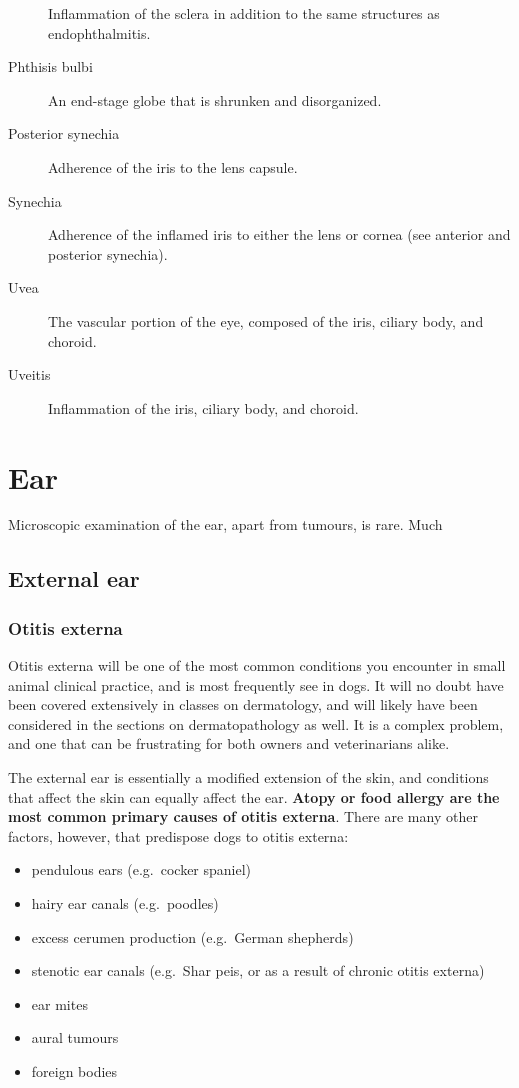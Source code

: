 \documentclass[openany]{book}
\providecommand{\tightlist}{%
  \setlength{\itemsep}{0pt}\setlength{\parskip}{0pt}}
\begin{document}
\begin{description}
Inflammation of the sclera in addition to the same structures as
endophthalmitis.
\item[Phthisis bulbi]
An end-stage globe that is shrunken and disorganized.
\item[Posterior synechia]
Adherence of the iris to the lens capsule.
\item[Synechia]
Adherence of the inflamed iris to either the lens or cornea (see
anterior and posterior synechia).
\item[Uvea]
The vascular portion of the eye, composed of the iris, ciliary body, and
choroid.
\item[Uveitis]
Inflammation of the iris, ciliary body, and choroid.
\end{description}

\chapter{Ear}\label{ear}

Microscopic examination of the ear, apart from tumours, is rare. Much

\section{External ear}\label{external-ear}

\hypertarget{otitis-externa}{\subsection{Otitis
externa}\label{otitis-externa}}

Otitis externa will be one of the most common conditions you encounter
in small animal clinical practice, and is most frequently see in dogs.
It will no doubt have been covered extensively in classes on
dermatology, and will likely have been considered in the sections on
dermatopathology as well. It is a complex problem, and one that can be
frustrating for both owners and veterinarians alike.

The external ear is essentially a modified extension of the skin, and
conditions that affect the skin can equally affect the ear.
\textbf{Atopy or food allergy are the most common primary causes of
otitis externa}. There are many other factors, however, that predispose
dogs to otitis externa:

\begin{itemize}
\tightlist
\item
  pendulous ears (e.g.~cocker spaniel)
\item
  hairy ear canals (e.g.~poodles)
\item
  excess cerumen production (e.g.~German shepherds)
\item
  stenotic ear canals (e.g.~Shar peis, or as a result of chronic otitis
  externa)
\item
  ear mites
\item
  aural tumours
\item
  foreign bodies
\end{itemize}
\end{document}
